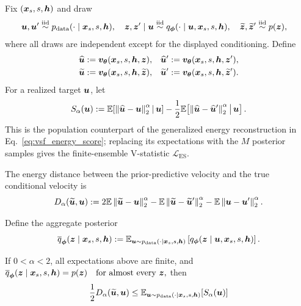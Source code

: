 Fix $({\bm{x}}_s,s,{\bm{h}})$ and draw
\begin{align*}
  {\bm{u}},{\bm{u}}'
  &\stackrel{\mathrm{iid}}{\sim}
  p_{\mathrm{data}}(\cdot\mid{\bm{x}}_s,s,{\bm{h}}),
  \quad
  {\bm{z}},{\bm{z}}'\mid{\bm{u}}
  \stackrel{\mathrm{iid}}{\sim}
  q_{\boldsymbol{\phi}}(\cdot\mid{\bm{u}},{\bm{x}}_s,s,{\bm{h}}),
  \quad
  \widetilde{{\bm{z}}},\widetilde{{\bm{z}}}'
  \stackrel{\mathrm{iid}}{\sim}p({\bm{z}}),
\end{align*}
where all draws are independent except for the displayed conditioning. Define
\begin{align*}
  \widehat{{\bm{u}}}
  &:=
  {\bm{v}}_{{\bm{\theta}}}({\bm{x}}_s,s,{\bm{h}},{\bm{z}}),
  &
  \widehat{{\bm{u}}}'
  &:=
  {\bm{v}}_{{\bm{\theta}}}({\bm{x}}_s,s,{\bm{h}},{\bm{z}}'),
  \\
  \widetilde{{\bm{u}}}
  &:=
  {\bm{v}}_{{\bm{\theta}}}({\bm{x}}_s,s,{\bm{h}},\widetilde{{\bm{z}}}),
  &
  \widetilde{{\bm{u}}}'
  &:=
  {\bm{v}}_{{\bm{\theta}}}({\bm{x}}_s,s,{\bm{h}},\widetilde{{\bm{z}}}').
\end{align*}
For a realized target ${\bm{u}}$, let
\begin{equation}
  S_\alpha({\bm{u}})
  :=
  \mathbb{E}\!\left[
    \left\|\widehat{{\bm{u}}}-{\bm{u}}\right\|_2^\alpha
    \,\middle|\,{\bm{u}}
  \right]
  -
  \frac12
  \mathbb{E}\!\left[
    \left\|\widehat{{\bm{u}}}-\widehat{{\bm{u}}}'\right\|_2^\alpha
    \,\middle|\,{\bm{u}}
  \right].
  \label{eq:vsf_population_energy_reconstruction}
\end{equation}
This is the population counterpart of the generalized energy reconstruction
in Eq.~\ref{eq:vsf_energy_score}; replacing its expectations with the $M$
posterior samples gives the finite-ensemble V-statistic
$\mathcal L_{\mathrm{ES}}$.

The energy distance between the prior-predictive velocity and the true
conditional velocity is
\begin{equation}
  D_\alpha(\widetilde{{\bm{u}}},{\bm{u}})
  :=
  2\mathbb{E}\left\|\widetilde{{\bm{u}}}-{\bm{u}}\right\|_2^\alpha
  -
  \mathbb{E}\left\|\widetilde{{\bm{u}}}-\widetilde{{\bm{u}}}'\right\|_2^\alpha
  -
  \mathbb{E}\left\|{\bm{u}}-{\bm{u}}'\right\|_2^\alpha.
  \label{eq:vsf_prior_energy_distance}
\end{equation}

Define the aggregate posterior
\begin{equation}
    \overline q_{\boldsymbol{\phi}}({\bm{z}}\mid{\bm{x}}_s,s,{\bm{h}})
    :=
    \mathbb{E}_{{\bm{u}}\sim
    p_{\mathrm{data}}(\cdot\mid{\bm{x}}_s,s,{\bm{h}})}
    \left[
        q_{\boldsymbol{\phi}}({\bm{z}}\mid{\bm{u}},{\bm{x}}_s,s,{\bm{h}})
    \right].
    \label{eq:aggregate_posterior}
\end{equation}

\begin{vsfproposition}
\label{prop:vsf_aggregate_energy_bound}
If $0<\alpha<2$, all expectations above are finite, and
\(
  \overline q_{\boldsymbol{\phi}}({\bm{z}}\mid{\bm{x}}_s,s,{\bm{h}})=p({\bm{z}})
  \quad\text{for almost every }{\bm{z}},
\)
then
\begin{equation}
  \frac12D_\alpha(\widetilde{{\bm{u}}},{\bm{u}})
  \leq
  \mathbb{E}_{{\bm{u}}\sim p_{\mathrm{data}}(\cdot\mid{\bm{x}}_s,s,{\bm{h}})}
  \!\left[S_\alpha({\bm{u}})\right]
  \label{eq:vsf_aggregate_energy_bound}
\end{equation}
\end{vsfproposition}

